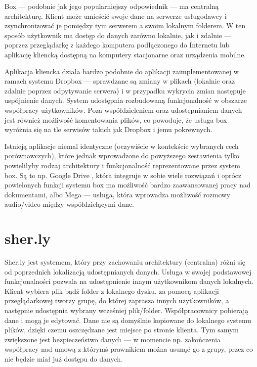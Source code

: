 \documentclass[polish,a4paper,twoside]{ppfcmthesis}
\begin{document}
Box --- podobnie jak jego popularniejszy odpowiednik --- ma centralną architekturę. Klient może umieścić swoje dane na serwerze usługodawcy i zsynchronizować je pomiędzy tym serwerem a swoim lokalnym folderem. W ten sposób użytkownik ma dostęp do danych zarówno lokalnie, jak i zdalnie --- poprzez przeglądarkę z każdego komputera podłączonego do Internetu lub aplikację kliencką dostępną na komputery stacjonarne oraz urządzenia mobilne.

Aplikacja kliencka działa bardzo podobnie do aplikacji zaimplementowanej w ramach systemu Dropbox --- sprawdzane są zmiany w plikach (lokalnie oraz zdalnie poprzez odpytywanie serwera) i w przypadku wykrycia zmian następuje uspójnienie danych. System udostępnia rozbudowaną funkcjonalność w obszarze współpracy użytkowników. Poza współdzieleniem oraz udostępnianiem danych jest również możliwość komentowania plików, co powoduje, że usługa box wyróżnia się na tle serwisów takich jak Dropbox i jemu pokrewnych.

Istnieją aplikacje niemal identyczne (oczywiście w kontekście wybranych cech porównawczych), które jednak wprowadzone do powyższego zestawienia tylko powieliłyby rodzaj architektury i funkcjonalność reprezentowane przez system box. Są to np. Google Drive \cite{googledrive}, która integruje w sobie wiele rozwiązań i oprócz powielonych funkcji systemu box ma możliwość bardzo zaawansowanej pracy nad dokumentami, albo Mega \cite{mega} --- usługa, która wprowadza możliwość rozmowy audio/video między współdzielącymi dane.

\section*{sher.ly}

Sher.ly \cite{sherly} jest systemem, który przy zachowaniu architektury (centralna) różni się od poprzednich lokalizacją udostępnianych danych. Usługa w swojej podstawowej funkcjonalności pozwala na udostępnienie innym użytkownikom danych lokalnych. Klient wybiera plik bądź folder z lokalnego dysku, za pomocą aplikacji przeglądarkowej tworzy grupę, do której zaprasza innych użytkowników, a następnie udostępnia wybrany wcześniej plik/folder. Współpracownicy pobierają dane i mogą je edytować. Dane nie są domyślnie kopiowane do lokalnego systemu plików, dzięki czemu oszczędzane jest miejsce po stronie klienta. Tym samym zwiększone jest bezpieczeństwo danych --- w momencie np. zakończenia współpracy nad umową z którymś prawnikiem można usunąć go z grupy, przez co nie będzie miał już dostępu do danych.
\end{document}
